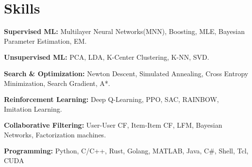 \documentclass[letterpaper,11pt]{article}
\newcommand{\resumeSubHeadingListStart}{\begin{itemize}[leftmargin=0in, label={}]}
\newcommand{\resumeSubHeadingListEnd}{\end{itemize}}
\begin{document}
\section{Skills}
  \vspace{2pt}
  \resumeSubHeadingListStart
    \small{\item{ 
        \textcolor{secondary_color}{\textbf{Supervised ML:}}{ Multilayer Neural Networks(MNN), Boosting, MLE, Bayesian Parameter Estimation, EM.} \\ \vspace{3pt}

        \textcolor{secondary_color}{\textbf{Unsupervised ML:}}{ PCA, LDA, K-Center Clustering, K-NN, SVD.} \\ \vspace{3pt}

        \textcolor{secondary_color}{\textbf{Search \& Optimization:}}{ Newton Descent, Simulated Annealing, Cross Entropy Minimization, Search Gradient, A*.} \\ \vspace{3pt}
        
        \textcolor{secondary_color}{\textbf{Reinforcement Learning:}}{ Deep Q-Learning, PPO, SAC, RAINBOW, Imitation Learning.} \\ \vspace{3pt}

        \textcolor{secondary_color}{\textbf{Collaborative Filtering:}}{ User-User CF, Item-Item CF, LFM, Bayesian Networks, Factorization machines.} \\ \vspace{3pt}

        \textcolor{secondary_color}{\textbf{Programming:}}{ Python, C/C++, Rust, Golang, MATLAB, Java, C\#, Shell, Tcl, CUDA} \\ \vspace{3pt}
    }}
  \resumeSubHeadingListEnd


\end{document}
